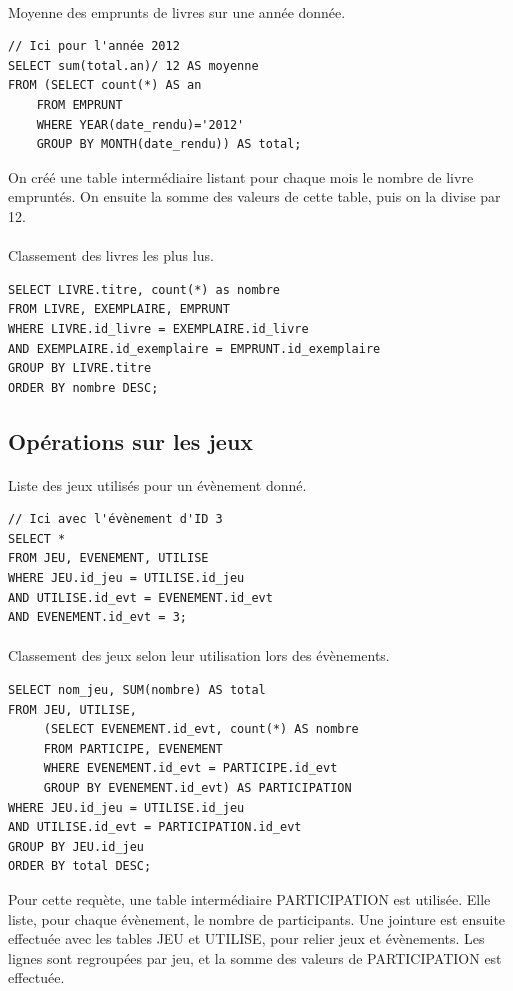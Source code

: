 \documentclass[a4paper, 11pt]{article}
\begin{document}
\paragraph{}
Moyenne des emprunts de livres sur une année donnée.
\begin{verbatim}
// Ici pour l'année 2012
SELECT sum(total.an)/ 12 AS moyenne 
FROM (SELECT count(*) AS an 
    FROM EMPRUNT 
    WHERE YEAR(date_rendu)='2012' 
    GROUP BY MONTH(date_rendu)) AS total;
\end{verbatim}
On créé une table intermédiaire listant pour chaque mois le nombre de livre empruntés. On ensuite la somme des valeurs de cette table, puis on la divise par 12.
\paragraph{}
Classement des livres les plus lus.
\begin{verbatim}
SELECT LIVRE.titre, count(*) as nombre 
FROM LIVRE, EXEMPLAIRE, EMPRUNT 
WHERE LIVRE.id_livre = EXEMPLAIRE.id_livre 
AND EXEMPLAIRE.id_exemplaire = EMPRUNT.id_exemplaire 
GROUP BY LIVRE.titre 
ORDER BY nombre DESC;
\end{verbatim}
\subsection{Opérations sur les jeux}
\paragraph{}
Liste des jeux utilisés pour un évènement donné.
\begin{verbatim}
// Ici avec l'évènement d'ID 3
SELECT *
FROM JEU, EVENEMENT, UTILISE
WHERE JEU.id_jeu = UTILISE.id_jeu
AND UTILISE.id_evt = EVENEMENT.id_evt
AND EVENEMENT.id_evt = 3;
\end{verbatim}
\paragraph{}
Classement des jeux selon leur utilisation lors des évènements.
\begin{verbatim}
SELECT nom_jeu, SUM(nombre) AS total
FROM JEU, UTILISE, 
     (SELECT EVENEMENT.id_evt, count(*) AS nombre 
     FROM PARTICIPE, EVENEMENT 
     WHERE EVENEMENT.id_evt = PARTICIPE.id_evt 
     GROUP BY EVENEMENT.id_evt) AS PARTICIPATION
WHERE JEU.id_jeu = UTILISE.id_jeu
AND UTILISE.id_evt = PARTICIPATION.id_evt
GROUP BY JEU.id_jeu
ORDER BY total DESC;
\end{verbatim}
Pour cette requète, une table intermédiaire PARTICIPATION est utilisée. Elle liste, pour chaque évènement, le nombre de participants. Une jointure est ensuite effectuée avec les tables JEU et UTILISE, pour relier jeux et évènements. Les lignes sont regroupées par jeu, et la somme des valeurs de PARTICIPATION est effectuée.
\end{document}
